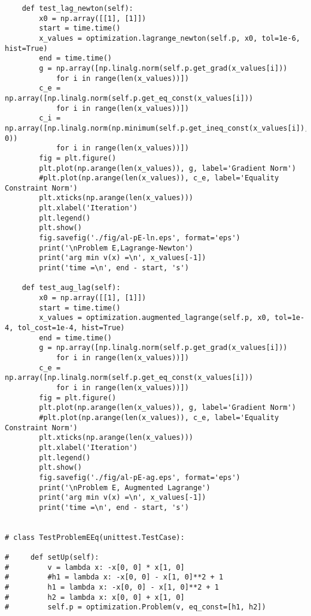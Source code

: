 \begin{lstlisting}
    def test_lag_newton(self):
        x0 = np.array([[1], [1]])
        start = time.time()
        x_values = optimization.lagrange_newton(self.p, x0, tol=1e-6, hist=True)
        end = time.time()
        g = np.array([np.linalg.norm(self.p.get_grad(x_values[i]))
            for i in range(len(x_values))])
        c_e = np.array([np.linalg.norm(self.p.get_eq_const(x_values[i]))
            for i in range(len(x_values))])
        c_i = np.array([np.linalg.norm(np.minimum(self.p.get_ineq_const(x_values[i]), 0))
            for i in range(len(x_values))])
        fig = plt.figure()
        plt.plot(np.arange(len(x_values)), g, label='Gradient Norm')
        #plt.plot(np.arange(len(x_values)), c_e, label='Equality Constraint Norm')
        plt.xticks(np.arange(len(x_values)))
        plt.xlabel('Iteration')
        plt.legend()
        plt.show()
        fig.savefig('./fig/al-pE-ln.eps', format='eps')
        print('\nProblem E,Lagrange-Newton')
        print('arg min v(x) =\n', x_values[-1])
        print('time =\n', end - start, 's')
    
    def test_aug_lag(self):
        x0 = np.array([[1], [1]])
        start = time.time()
        x_values = optimization.augmented_lagrange(self.p, x0, tol=1e-4, tol_cost=1e-4, hist=True)
        end = time.time()
        g = np.array([np.linalg.norm(self.p.get_grad(x_values[i]))
            for i in range(len(x_values))])
        c_e = np.array([np.linalg.norm(self.p.get_eq_const(x_values[i]))
            for i in range(len(x_values))])
        fig = plt.figure()
        plt.plot(np.arange(len(x_values)), g, label='Gradient Norm')
        #plt.plot(np.arange(len(x_values)), c_e, label='Equality Constraint Norm')
        plt.xticks(np.arange(len(x_values)))
        plt.xlabel('Iteration')
        plt.legend()
        plt.show()
        fig.savefig('./fig/al-pE-ag.eps', format='eps')
        print('\nProblem E, Augmented Lagrange')
        print('arg min v(x) =\n', x_values[-1])
        print('time =\n', end - start, 's')


# class TestProblemEEq(unittest.TestCase):

#     def setUp(self):
#         v = lambda x: -x[0, 0] * x[1, 0]
#         #h1 = lambda x: -x[0, 0] - x[1, 0]**2 + 1
#         h1 = lambda x: -x[0, 0] - x[1, 0]**2 + 1
#         h2 = lambda x: x[0, 0] + x[1, 0]
#         self.p = optimization.Problem(v, eq_const=[h1, h2])


\end{lstlisting}
